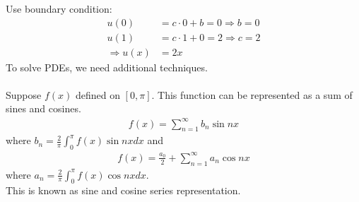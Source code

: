 \documentclass[12pt, letterpaper]{article}
\begin{document}
Use boundary condition:
\begin{align*}
    u(0) &= c\cdot 0 + b = 0 \Rightarrow b = 0 \\
    u(1) &= c\cdot 1 + 0 = 2 \Rightarrow c = 2 \\
    \Rightarrow u(x) &= 2x 
\end{align*}
To solve PDEs, we need additional techniques. \\ \\
Suppose $f(x)$ defined on $[0,\pi]$. This function can be represented as a sum of sines and cosines.
\begin{align*}
    f(x) = \sum_{n=1}^{\infty} b_n \sin nx
\end{align*}
where $b_n = \frac{2}{\pi} \int_{0}^{\pi} f(x) \sin nx dx$ and
\begin{align*}
    f(x) = \frac{a_0}{2} + \sum_{n=1}^{\infty}a_n \cos nx
\end{align*}
where $a_n = \frac 2\pi \int_{0}^{\pi} f(x) \cos nx dx$. \\
This is known as sine and cosine series representation.
\end{document}
